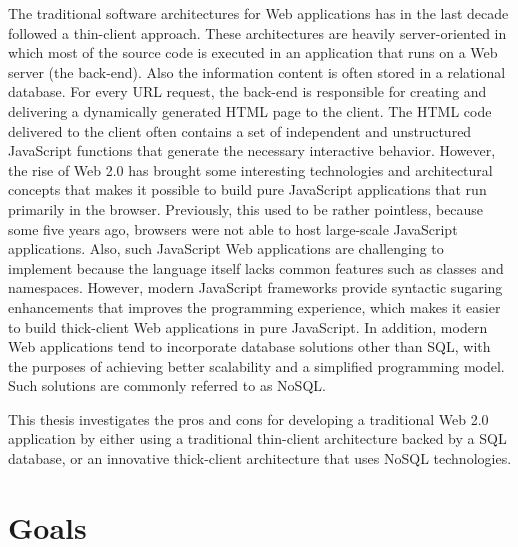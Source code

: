 The traditional software architectures for Web applications has in the last decade followed a thin-client approach. These architectures are heavily server-oriented in which most of the source code is executed in an application that runs on a Web server (the back-end). Also the information content is often stored in a relational database. For every URL request, the back-end is responsible for creating and delivering a dynamically generated HTML page to the client. The HTML code delivered to the client often contains a set of independent and unstructured JavaScript functions that generate the necessary interactive behavior. However, the rise of Web 2.0 has brought some interesting technologies and architectural concepts that makes it possible to build pure JavaScript applications that run primarily in the browser. Previously, this used to be rather pointless, because some five years ago, browsers were not able to host large-scale JavaScript applications. Also, such JavaScript Web applications are challenging to implement because the language itself lacks common features such as classes and namespaces. However, modern JavaScript frameworks provide syntactic sugaring enhancements that improves the programming experience, which makes it easier to build thick-client Web applications in pure JavaScript. In addition, modern Web applications tend to incorporate database solutions other than SQL, with the purposes of achieving better scalability and a simplified programming model. Such solutions are commonly referred to as NoSQL\cite{nosql}.  

This thesis investigates the pros and cons for developing a traditional Web 2.0 application by either using a traditional thin-client architecture backed by a SQL database, or an innovative thick-client architecture that uses NoSQL technologies. 
		
\section{Goals}


